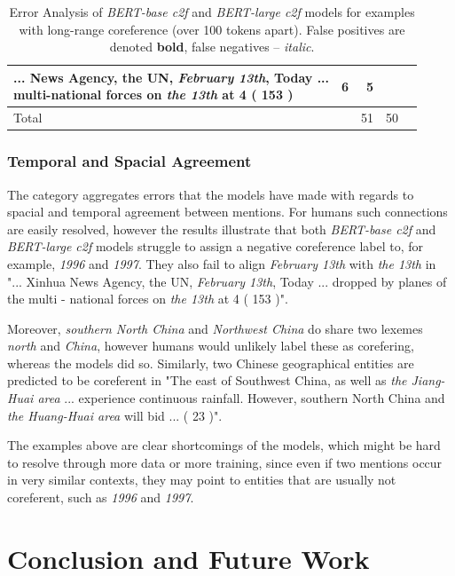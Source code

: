 \documentclass[11pt]{article}
\begin{document}
\begin{table}[b!]
\begin{tabular*}{\textwidth}{@{\extracolsep{\fill}} l *{4}{d{1.2}} }
{{... News Agency, the UN, \textit{February 13th}, Today ... \\  multi-national forces on \textit{the 13th} at 4 ( 153 ) 
}} & 6 & 5 \\
\midrule
Total &  & 51 & 50 \\
\bottomrule
\end{tabular*}
\caption{Error Analysis of \textit{BERT-base c2f} and \textit{BERT-large c2f} models for examples with long-range coreference (over 100 tokens apart). False positives are denoted \textbf{bold}, false negatives -- \textit{italic}. }
\label{table:error-over-100}
\end{table}

\subsubsection{Temporal and Spacial Agreement}
The category aggregates errors that the models have made with regards to spacial and temporal agreement between mentions. For humans such connections are easily resolved, however the results illustrate that both \textit{BERT-base c2f} and \textit{BERT-large c2f} models struggle to assign a negative coreference label to, for example, \textit{1996} and \textit{1997}. They also fail to align \textit{February 13th} with \textit{the 13th} in "... Xinhua News Agency, the UN, \textit{February 13th}, Today ... dropped by planes of the multi - national forces on \textit{the 13th} at 4 ( 153 )". 

Moreover, \textit{southern North China} and \textit{Northwest China} do share two lexemes \textit{north} and \textit{China}, however humans would unlikely label these as corefering, whereas the models did so. Similarly, two Chinese geographical entities are predicted to be coreferent in "The east of Southwest China, as well as \textit{the Jiang-Huai area} ... experience continuous rainfall. However, southern North China and \textit{the Huang-Huai area} will bid ... ( 23 )". 

The examples above are clear shortcomings of the models, which might be hard to resolve through more data or more training, since even if two mentions occur in very similar contexts, they may point to entities that are usually not coreferent, such as \textit{1996} and \textit{1997}. 


\section{Conclusion and Future Work}
\end{document}
